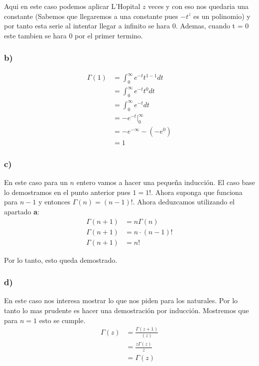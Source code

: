 \documentclass[12pt]{exam}
\begin{document}
Aqui en este caso podemos aplicar L'Hopital $z$ veces y con eso nos quedaria una constante (Sabemos que llegaremos a una constante pues $-t^{z}$ es un polinomio) y por tanto esta serie al intentar llegar a infinito se hara $0$. Ademas, cuando t = 0 este tambien se hara 0 por el primer termino.

\subsubsection*{b)}
\begin{align*}
  \Gamma(1) &= \int_0^\infty e^{-t}t^{1 - 1}dt\\
  &= \int_0^\infty e^{-t}t^{0}dt\\
  &= \int_0^\infty e^{-t}dt\\
  &= -e^{-t}|_0^\infty\\
  &= -e^{-\infty} - (-e^{0})\\
  &= 1
\end{align*}
\subsubsection*{c)}

En este caso para un $n$ entero vamos a hacer una pequeña inducción. El caso base lo demostramos en el punto anterior pues $1 = 1!$. Ahora suponga que funciona para $n - 1$ y entonces $\Gamma(n) = (n - 1)!$. Ahora deduzcamos utilizando el apartado \textbf{a}:
\begin{align*}
  \Gamma(n + 1) &= n\Gamma(n)\\
  \Gamma(n + 1) &= n\cdot (n - 1)!\\
  \Gamma(n + 1) &= n!
\end{align*}

Por lo tanto, esto queda demostrado.

\subsubsection*{d)}

En este caso nos interesa mostrar lo que nos piden para los naturales. Por lo tanto lo mas prudente es hacer una demostración por inducción. Mostremos que para $n = 1$ esto se cumple.
\begin{align*}
  \Gamma(z) &= \frac{\Gamma(z + 1)}{(z)}\\
  &= \frac{z\Gamma(z)}{z}\\
  &= \Gamma(z)
\end{align*}
\end{document}
